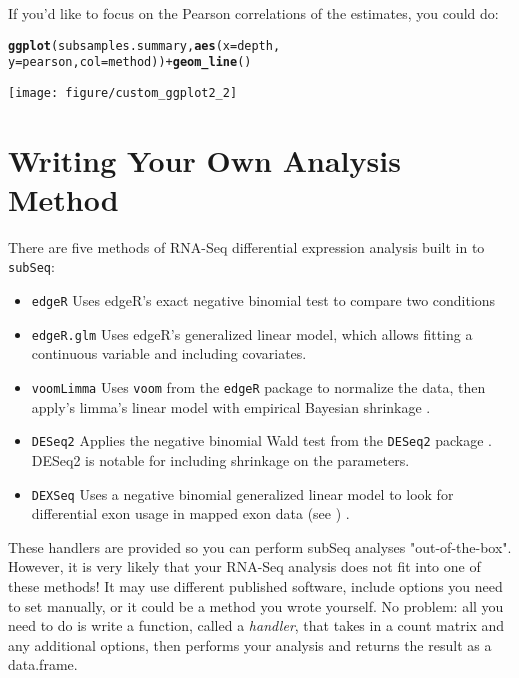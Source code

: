 \documentclass{article}\usepackage[]{graphicx}\usepackage[]{color}
\makeatletter
\newcommand{\hlopt}[1]{\textcolor[rgb]{0,0,0}{#1}}%
\newcommand{\hlstd}[1]{\textcolor[rgb]{0.345,0.345,0.345}{#1}}%
\newcommand{\hlkwc}[1]{\textcolor[rgb]{0.333,0.667,0.333}{#1}}%
\newcommand{\hlkwd}[1]{\textcolor[rgb]{0.737,0.353,0.396}{\textbf{#1}}}%
\newenvironment{kframe}{%
 \def\at@end@of@kframe{}%
 \ifinner\ifhmode%
  \def\at@end@of@kframe{\end{minipage}}%
  \begin{minipage}{\columnwidth}%
 \fi\fi%
 \def\FrameCommand##1{\hskip\@totalleftmargin \hskip-\fboxsep
 \colorbox{shadecolor}{##1}\hskip-\fboxsep
     \hskip-\linewidth \hskip-\@totalleftmargin \hskip\columnwidth}%
 \MakeFramed {\advance\hsize-\width
   \@totalleftmargin\z@ \linewidth\hsize
   \@setminipage}}%
 {\par\unskip\endMakeFramed%
 \at@end@of@kframe}
\newenvironment{knitrout}{}{} %
\makeatother
\begin{document}
If you'd like to focus on the Pearson correlations of the estimates, you could do:

\begin{knitrout}
\color{fgcolor}\begin{kframe}
\begin{alltt}
\hlkwd{ggplot}\hlstd{(subsamples.summary,} \hlkwd{aes}\hlstd{(}\hlkwc{x} \hlstd{= depth,}
    \hlkwc{y} \hlstd{= pearson,} \hlkwc{col} \hlstd{= method))} \hlopt{+} \hlkwd{geom_line}\hlstd{()}
\end{alltt}
\end{kframe}
\texttt{[image: figure/custom\_ggplot2\_2]} 

\end{knitrout}

\section{Writing Your Own Analysis Method}

\label{sec:custom_handler}

There are five methods of RNA-Seq differential expression analysis built in to \texttt{subSeq}:

\begin{itemize}
\item \texttt{edgeR} Uses edgeR's exact negative binomial test to compare two conditions \cite{Robinson:2010p11822} 
\item \texttt{edgeR.glm} Uses edgeR's generalized linear model, which allows fitting a continuous variable and including covariates.
\item \texttt{voomLimma} Uses \texttt{voom} from the \texttt{edgeR} package to normalize the data, then apply's limma's linear model with empirical Bayesian shrinkage \cite{Law:2014}.
\item \texttt{DESeq2} Applies the negative binomial Wald test from the \texttt{DESeq2} package \cite{Anders:2010}. DESeq2 is notable for including shrinkage on the parameters.
\item \texttt{DEXSeq} Uses a negative binomial generalized linear model to look for differential exon usage in mapped exon data (see ) \cite{Anders:2012es}.
\end{itemize}

These handlers are provided so you can perform subSeq analyses "out-of-the-box". However, it is very likely that your RNA-Seq analysis does not fit into one of these methods! It may use different published software, include options you need to set manually, or it could be a method you wrote yourself. No problem: all you need to do is write a function, called a \emph{handler}, that takes in a count matrix and any additional options, then performs your analysis and returns the result as a data.frame.
\end{document}
